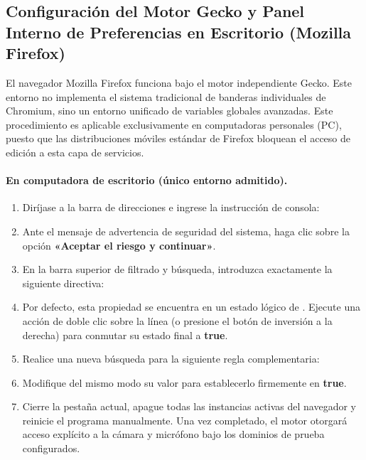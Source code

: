 \subsection[Mozilla Firefox (solo Escritorio)]{Configuración del Motor Gecko y Panel Interno de Preferencias en Escritorio (Mozilla Firefox)}%
\label{subsec:firefox}

El navegador Mozilla Firefox funciona bajo el motor independiente Gecko. Este entorno no
implementa el sistema tradicional de banderas individuales de Chromium, sino un entorno
unificado de variables globales avanzadas. Este procedimiento es aplicable exclusivamente
en computadoras personales (PC), puesto que las distribuciones móviles estándar de Firefox
bloquean el acceso de edición a esta capa de servicios.\par

\paragraph{En computadora de escritorio (único entorno admitido).}
\begin{enumerate}[noitemsep]
    \item Diríjase a la barra de direcciones e ingrese la instrucción de consola: 
    \item Ante el mensaje de advertencia de seguridad del sistema, haga clic sobre la opción \textbf{«Aceptar el riesgo y continuar»}.
    \item En la barra superior de filtrado y búsqueda, introduzca exactamente la siguiente directiva: \\ 
    \item Por defecto, esta propiedad se encuentra en un estado lógico de . Ejecute una acción de doble clic sobre la línea (o presione el botón de inversión a la derecha) para conmutar su estado final a \textbf{true}.
    \item Realice una nueva búsqueda para la siguiente regla complementaria: \\ 
    \item Modifique del mismo modo su valor para establecerlo firmemente en \textbf{true}.
    \item Cierre la pestaña actual, apague todas las instancias activas del navegador y reinicie el programa manualmente. Una vez completado, el motor otorgará acceso explícito a la cámara y micrófono bajo los dominios de prueba configurados.
\end{enumerate}

